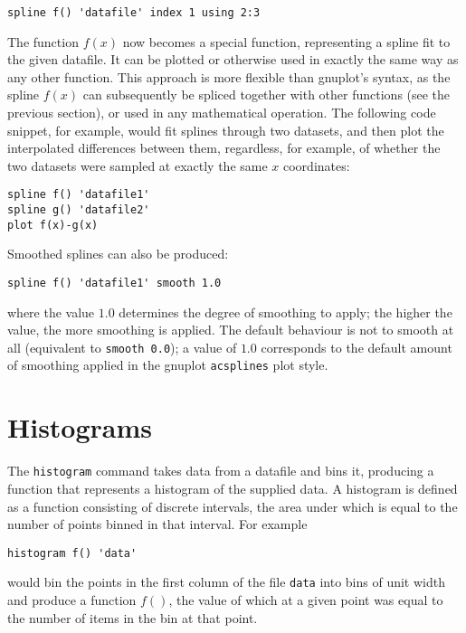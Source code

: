 \documentclass[a4paper,onecolumn,11pt]{book}
\begin{document}
\begin{verbatim}
spline f() 'datafile' index 1 using 2:3
\end{verbatim}

The function $f(x)$ now becomes a special function, representing a spline fit
to the given datafile. It can be plotted or otherwise used in exactly the same
way as any other function. This approach is more flexible than gnuplot's
syntax, as the spline $f(x)$ can subsequently be spliced together with other
functions (see the previous section), or used in any mathematical operation.
The following code snippet, for example, would fit splines through two
datasets, and then plot the interpolated differences between them, regardless,
for example, of whether the two datasets were sampled at exactly the same $x$
coordinates:

\begin{verbatim}
spline f() 'datafile1'
spline g() 'datafile2'
plot f(x)-g(x)
\end{verbatim}

Smoothed splines can also be produced:

\begin{verbatim}
spline f() 'datafile1' smooth 1.0
\end{verbatim}

\noindent where the value $1.0$ determines the degree of smoothing to apply;
the higher the value, the more smoothing is applied. The default behaviour is
not to smooth at all (equivalent to \texttt{smooth 0.0}); a value of $1.0$
corresponds to the default amount of smoothing applied in the
gnuplot \texttt{acsplines} plot style.

\section{Histograms}

The \texttt{histogram}
command takes data from a datafile and bins it, producing a function that
represents a histogram of the supplied data.  A histogram is defined as a
function consisting of discrete intervals, the area under which is equal to the
number of points binned in that interval.  For example

\begin{verbatim}
histogram f() 'data'
\end{verbatim}

\noindent would bin the points in the first column of the file {\tt data} into bins of
unit width and produce a function $f()$, the value of which at a given point was
equal to the number of items in the bin at that point.
\end{document}
